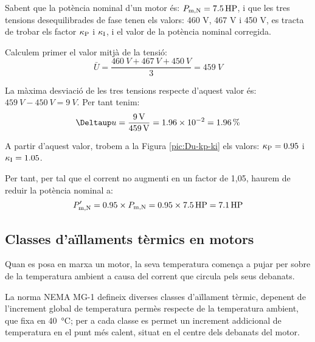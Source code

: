 \begin{center}
    
    \label{pic:Du-kp-ki}
\end{center}

\begin{exemple}
    Sabent que la  potència nominal d'un motor és: $P_\mathrm{m,N} = \SI{7,5}{HP}$, i que les tres tensions desequilibrades  de fase tenen els valors: 460 V, 467 V i 450 V, es tracta de trobar els factor $\kappa_\mathrm{P}$ i  $\kappa_\mathrm{I}$, i el valor de la potència nominal corregida.

    Calculem primer el valor mitjà de la tensió:
    \[
      \bar{U} = \frac{\SI{460}{V}+\SI{467}{V}+\SI{450}{V}}{3} = \SI{459}{V}
    \]

    La màxima desviació de les tres tensions respecte d'aquest valor és: $\SI{459}{V}-\SI{450}{V} = \SI{9}{V}$. Per tant tenim:
    \[
        \Deltaup u = \frac{\SI{9}{V}}{\SI{459}{V}} = \num{1,96e-2} = \SI{1,96}{\%}
    \]

     A partir d'aquest valor, trobem a la Figura \vref{pic:Du-kp-ki} els valors:  $\kappa_\mathrm{P} = \num{0,95}$ i  $\kappa_\mathrm{I}=\num{1,05}$.

     Per tant, per tal que el corrent no augmenti en un factor de 1,05, haurem de reduir la potència nominal a:
     \[
         P'_\mathrm{m,N} = \num{0,95}\times{}P_\mathrm{m,N}  = \num{0,95}\times\SI{7,5}{HP} = \SI{7,1}{HP}
     \]
\end{exemple}

\subsection{Classes d'aïllaments tèrmics en motors}

Quan es posa en marxa un motor, la seva temperatura comença a pujar
per sobre de la temperatura ambient a causa del corrent que circula
pels seus debanats.

La norma NEMA MG-1 defineix diverses classes d'aïllament tèrmic, depenent de
l'increment global de temperatura permès respecte de la temperatura
ambient, que fixa en \SI{40}{\degreeCelsius};
per a cada classe es permet un increment addicional de temperatura
en el punt més calent, situat en el centre dels debanats del
motor.

